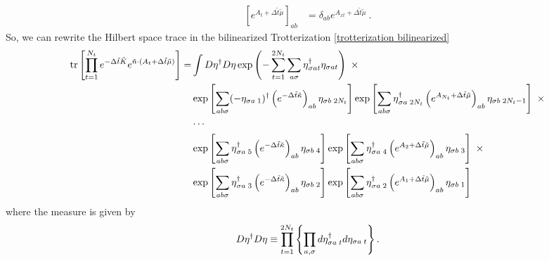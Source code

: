 \begin{align}
	\left[e^{A_t+ \Delta \tilde{t} \tilde{\mu}}\right]_{ab} &= \delta_{ab} e^{A_{xt} + \Delta \tilde{t} \tilde{\mu}}~.
\end{align}
So, we can rewrite the Hilbert space trace in the bilinearized Trotterization \eqref{trotterization bilinearized}
\begin{align}
	\text{tr}\left[\prod_{t=1}^{N_t} e^{-\Delta \tilde{t}\tilde{K}}  e^{ \tilde{n}\cdot (A_t + \Delta\tilde{t} \tilde{\mu})} \right]
	=& \int D\eta{}^{\dagger} D\eta \exp\left( - \sum_{t=1}^{2N_t}\sum_{a\sigma} \eta{}^{\dagger}_{\sigma a t} \eta_{\sigma a t}\right)~ \times
	\nonumber\\
	&
		\exp\left[ \sum_{ab\sigma} (-\eta_{\sigma a\;1}){}^{\dagger} \left(e^{-\Delta \tilde{t} \tilde{\kappa}}\right)_{ab} \eta_{\sigma b\;2N_t} \right]
		\exp\left[ \sum_{ab\sigma} \eta{}^{\dagger}_{\sigma a\;2N_t} \left(e^{A_{N_t}+\Delta\tilde{t}\tilde{\mu}}\right)_{ab} \eta_{\sigma b\;2N_t-1}\right] ~ \times
	\nonumber\\
	&
		\cdots
	\nonumber\\
	&
		\exp\left[ \sum_{ab\sigma} \eta{}^{\dagger}_{\sigma a\;5} \left(e^{-\Delta \tilde{t} \tilde{\kappa}}\right)_{ab} \eta_{\sigma b\;4} \right]
		\exp\left[ \sum_{ab\sigma} \eta{}^{\dagger}_{\sigma a\;4} \left(e^{A_{2}+\Delta\tilde{t}\tilde{\mu}}\right)_{ab} \eta_{\sigma b\;3}\right] ~ \times
	\nonumber\\
	&
		\exp\left[ \sum_{ab\sigma} \eta{}^{\dagger}_{\sigma a\;3} \left(e^{-\Delta \tilde{t} \tilde{\kappa}}\right)_{ab} \eta_{\sigma b\;2} \right]
		\exp\left[ \sum_{ab\sigma} \eta{}^{\dagger}_{\sigma a\;2} \left(e^{A_{1}+\Delta\tilde{t}\tilde{\mu}}\right)_{ab} \eta_{\sigma b\;1}\right]
\end{align}
where the measure is given by
\begin{equation}
	D\eta{}^{\dagger} D\eta \equiv \prod_{t=1}^{2N_t} \left\{ \prod_{a, \sigma} d \eta^{\dagger}_{\sigma a\; t} d\eta_{\sigma a\; t} \right\}.
\end{equation}

